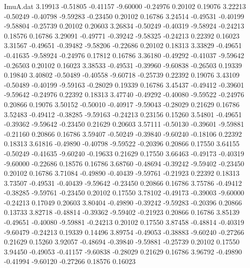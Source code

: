 \begin{filecontents}{ImuA.dat}
   3.19913   -0.51805   -0.41157   -9.60000   -0.24976    0.20102    0.19076
   3.22213   -0.50249   -0.40798   -9.59283   -0.23450    0.20102    0.16786
   3.24514   -0.49531   -0.40199   -9.58804   -0.25739    0.20102    0.20603
   3.26834   -0.50249   -0.40319   -9.58924   -0.24213    0.18576    0.16786
   3.29091   -0.49771   -0.39242   -9.58325   -0.24213    0.22392    0.16023
   3.31567   -0.49651   -0.39482   -9.58206   -0.22686    0.20102    0.18313
   3.33829   -0.49651   -0.41635   -9.58924   -0.24976    0.17812    0.16786
   3.36180   -0.49292   -0.41037   -9.59642   -0.26503    0.20102    0.16023
   3.38533   -0.49531   -0.39960   -9.60838   -0.26503    0.19339    0.19840
   3.40802   -0.50489   -0.40558   -9.60718   -0.25739    0.22392    0.19076
   3.43109   -0.50489   -0.40199   -9.59163   -0.28029    0.19339    0.16786
   3.45437   -0.49412   -0.39601   -9.59642   -0.24976    0.22392    0.18313
   3.47740   -0.49292   -0.40080   -9.59522   -0.24976    0.20866    0.19076
   3.50152   -0.50010   -0.40917   -9.59043   -0.28029    0.21629    0.16786
   3.52483   -0.49412   -0.38285   -9.59163   -0.24213    0.23156    0.15260
   3.54801   -0.49651   -0.39362   -9.59642   -0.23450    0.21629    0.20603
   3.57111   -0.50130   -0.39601   -9.59881   -0.21160    0.20866    0.16786
   3.59407   -0.50249   -0.39840   -9.60240   -0.18106    0.22392    0.18313
   3.61816   -0.49890   -0.40798   -9.59522   -0.20396    0.20866    0.17550
   3.64155   -0.50249   -0.41635   -9.60240   -0.19633    0.21629    0.17550
   3.66463   -0.49173   -0.40319   -9.60000   -0.22686    0.18576    0.16786
   3.68760   -0.48694   -0.39242   -9.59402   -0.23450    0.20102    0.16786
   3.71084   -0.49890   -0.40439   -9.59761   -0.21923    0.22392    0.18313
   3.73507   -0.49531   -0.40439   -9.59642   -0.23450    0.20866    0.16786
   3.75786   -0.49412   -0.38285   -9.59761   -0.23450    0.20102    0.17550
   3.78102   -0.49173   -0.39003   -9.60000   -0.24213    0.17049    0.20603
   3.80404   -0.49890   -0.39242   -9.59283   -0.20396    0.20866    0.13733
   3.82718   -0.48814   -0.39362   -9.59402   -0.21923    0.20866    0.16786
   3.85139   -0.49651   -0.40080   -9.59881   -0.24213    0.20102    0.17550
   3.87458   -0.48814   -0.40319   -9.60479   -0.24213    0.19339    0.14496
   3.89754   -0.49053   -0.38883   -9.60240   -0.27266    0.21629    0.15260
   3.92057   -0.48694   -0.39840   -9.59881   -0.25739    0.20102    0.17550
   3.94450   -0.49053   -0.41157   -9.60838   -0.28029    0.21629    0.16786
   3.96792   -0.49890   -0.41994   -9.60120   -0.27266    0.18576    0.16023

\end{filecontents}
